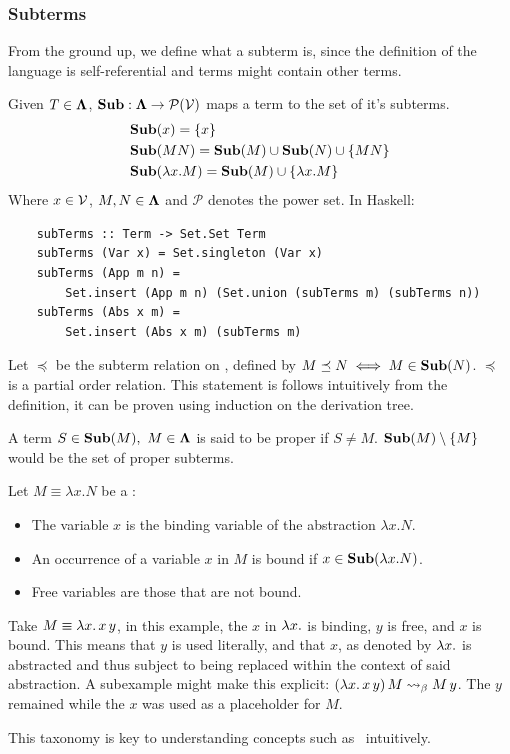 \subsubsection{\centering Subterms}
From the ground up, we define what a subterm is, since the definition of the language is self-referential and terms might contain other terms.
\begin{definition} Given $T \in \mathbf{\Lambda}$, $\mathbf{Sub} : \mathbf{\Lambda} \to \mathcal{P}(\mathcal{V})$ maps a term to the set of it's subterms.
  \begin{align*}
    &\mathbf{Sub}(x) = \{x\} \\
    &\mathbf{Sub}(MN) = \mathbf{Sub}(M)  \cup \mathbf{Sub}(N) \cup \{MN\} \\
    &\mathbf{Sub}(\lambda x . M) = \mathbf{Sub}(M)  \cup \{\lambda x. M\}
  \end{align*}
  Where $x \in \mathcal{V}$, $M, N \in \mathbf{\Lambda} $ and $\mathcal{P}$ denotes the power set. In Haskell:
  \begin{verbatim}
    subTerms :: Term -> Set.Set Term
    subTerms (Var x) = Set.singleton (Var x)
    subTerms (App m n) =
        Set.insert (App m n) (Set.union (subTerms m) (subTerms n))
    subTerms (Abs x m) =
        Set.insert (Abs x m) (subTerms m)
  \end{verbatim}  
\end{definition}
\begin{remark}
  Let \( \preceq \) be the subterm relation on \lterms, defined by
  \(
    M \preceq N \iff M \in \mathbf{Sub}( N )
  \).
  \( \preceq \) is a partial order relation. This statement is follows intuitively from the definition, it can be proven using induction on the derivation tree.
\end{remark}
\begin{definition} A term $ S \in \mathbf{Sub}(M), \ M \in \mathbf{\Lambda}$ is said to be proper if $S \neq M$. $\mathbf{Sub}(M) \setminus \{M\}$ would be the set of proper subterms.
\end{definition}
\begin{definition} Let \( M \equiv \lambda x. N \) be a \lterm:
  \begin{itemize}
  \item The variable \( x \) is the binding variable of the abstraction \( \lambda x. N \).
  \item An occurrence of a variable \( x \) in \( M \) is bound if \( x \in \mathbf{Sub}( \lambda x. N ) \).
  \item Free variables are those that are not bound.
  \end{itemize}
\end{definition}
\begin{example}
  Take $ M \equiv \lambda x . \, x \, y $, in this example, the $x$ in $\lambda x. $ is binding, $y$ is free, and $x$ is bound. This means that $y$ is used literally, and that $x$, as denoted by $\lambda x.$ is abstracted and thus subject to being replaced within the context of said abstraction. A subexample might make this explicit: $ (\lambda x . \, x \, y) \, M \mathrel{\leadsto}_\beta M \, y $. The $y$ remained while the $x$ was used as a placeholder for $M$.
\end{example}
\begin{note}
  This taxonomy is key to understanding concepts such as \aequiv \ intuitively.
\end{note}
